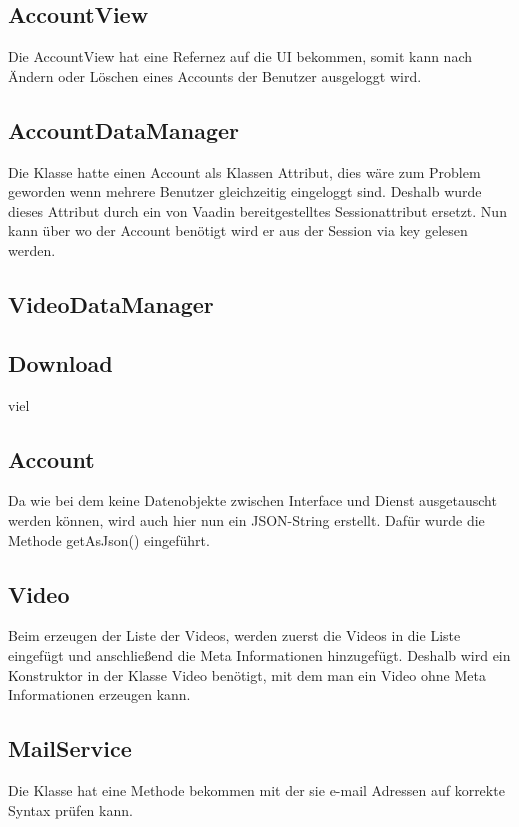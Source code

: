 \subsection{AccountView}
Die AccountView hat eine Refernez auf die UI bekommen, somit kann nach Ändern oder Löschen eines Accounts der Benutzer ausgeloggt wird.

\subsection{AccountDataManager}
Die Klasse hatte einen Account als Klassen Attribut, dies wäre zum Problem geworden wenn mehrere Benutzer gleichzeitig eingeloggt sind. Deshalb wurde dieses Attribut durch ein von Vaadin bereitgestelltes Sessionattribut ersetzt. Nun kann über wo der Account benötigt wird er aus der Session via key gelesen werden.

\subsection{VideoDataManager}


\subsection{Download} \label{sec:Download}
viel

\subsection{Account}
Da wie bei dem  keine Datenobjekte zwischen Interface und Dienst ausgetauscht werden können, wird auch hier nun ein JSON-String erstellt. Dafür wurde die Methode getAsJson() eingeführt.

\subsection{Video}
Beim erzeugen der Liste der Videos, werden zuerst die Videos in die Liste eingefügt und anschließend die Meta Informationen hinzugefügt. Deshalb wird ein Konstruktor in der Klasse Video benötigt, mit dem man ein Video ohne Meta Informationen erzeugen kann.

\subsection{MailService}
Die Klasse hat eine Methode bekommen mit der sie e-mail Adressen auf korrekte Syntax prüfen kann.